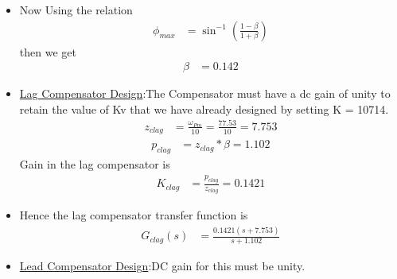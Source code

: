 \begin{enumerate}[label=\thesubsection.\arabic*.,ref=\thesubsection.\theenumi]
\begin{itemize}
\item Now Using the relation 
\begin{align}
    \phi_{max} &= \sin^{-1}(\frac{1-\beta}{1+\beta})
\end{align}
then we get
\begin{align}
    \beta &= 0.142
\end{align}
\item \underline{Lag Compensator Design}:The Compensator must have a dc gain of unity to retain the value of Kv that we have already designed by setting K = 10714.
\begin{align}
    z_{clag} &= \frac{\omega_{Pm}}{10}=\frac{77.53}{10}=7.753
\end{align}
\begin{align}
    p_{clag} &= z_{clag}*\beta=1.102
\end{align}
Gain in the lag compensator is 
\begin{align}
    K_{clag} &= \frac{p_{clag}}{z_{clag}}=0.1421
\end{align}
\item Hence the lag compensator transfer function is
\begin{align}
 G_{clag}(s) &= \frac{0.1421(s+7.753)}{s+1.102} 
\end{align}
\item \underline{Lead Compensator Design}:DC gain for this must be unity.


\end{itemize}
\end{enumerate}
